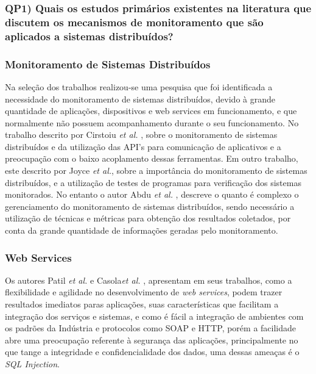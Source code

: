 \subsubsection{QP1) Quais os estudos primários existentes na literatura que discutem os mecanismos de monitoramento que são aplicados a sistemas distribuídos?}

\subsubsection{Monitoramento de Sistemas Distribuídos}
Na seleção dos trabalhos realizou-se uma pesquisa que foi identificada a necessidade do monitoramento de sistemas distribuídos, devido à grande quantidade de  aplicações, dispositivos e web services em funcionamento, e que normalmente não possuem acompanhamento durante o seu funcionamento. No trabalho descrito por Cirstoiu \textit{et al.} \cite{cirstoiu2007monitoring},  sobre o monitoramento de sistemas distribuídos e da utilização das API's para comunicação de aplicativos e a preocupação com o baixo acoplamento dessas ferramentas. Em outro trabalho,  este descrito por Joyce \textit{et al.}\cite{joyce1987monitoring}, sobre a importância do monitoramento de sistemas distribuídos, e a utilização de testes de programas para verificação dos sistemas monitorados. No entanto o autor Abdu \textit{et al.} \cite{abdu1996monitoring}, descreve o quanto é complexo o gerenciamento do monitoramento de sistemas distribuídos, sendo necessário a utilização de técnicas e métricas para obtenção dos resultados coletados, por conta da grande quantidade de informações geradas pelo monitoramento.  

\subsubsection{Web Services}

Os autores Patil \textit{et al.} e Casola\textit{et al.} \cite{patil2012remote,casola2009sensim}, apresentam em seus trabalhos, como a flexibilidade e agilidade no desenvolvimento de \textit{web services}, podem trazer resultados imediatos paras aplicações, suas características que facilitam a integração dos serviços e sistemas, e como é fácil a integração de ambientes com os padrões da Indústria e protocolos como SOAP e HTTP, porém a facilidade abre uma preocupação referente à segurança das aplicações, principalmente no que tange a integridade e confidencialidade dos dados, uma dessas ameaças é o \textit{SQL Injection}. 

